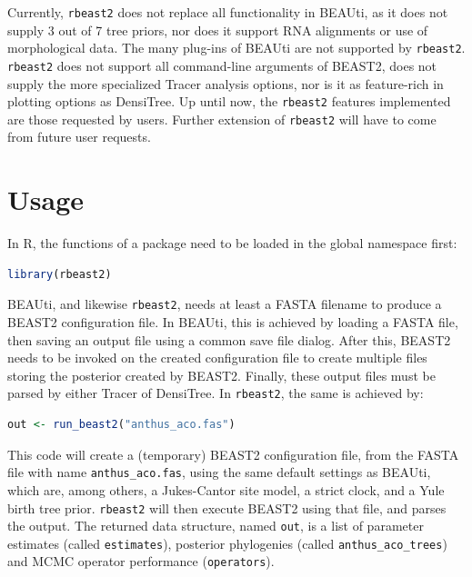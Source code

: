 \documentclass{article}
\begin{document}
Currently, \verb;rbeast2; does not replace all functionality in BEAUti,
as it does not supply 3 out of 7 tree priors, nor does it support RNA
alignments or use of morphological data. The many plug-ins of BEAUti
are not supported by \verb;rbeast2;. \verb;rbeast2; does not support
all command-line arguments of BEAST2, does not supply
the more specialized Tracer analysis options, nor is it as feature-rich
in plotting options as DensiTree. Up until now, the \verb;rbeast2; features 
implemented are those requested by users. Further extension of \verb;rbeast2; 
will have to come from future user requests.

\section{Usage}

In R, the functions of a package need to be loaded in the global namespace first:

\begin{lstlisting}[language=R, floatplacement=H]
library(rbeast2)
\end{lstlisting}

BEAUti, and likewise \verb;rbeast2;, needs at least a FASTA filename
to produce a BEAST2 configuration file. 
In BEAUti, this is achieved by loading a FASTA file, 
then saving an output file using a common
save file dialog. After this, BEAST2 needs to be invoked
on the created configuration file to create multiple files
storing the posterior created by BEAST2. Finally, these output
files must be parsed by either Tracer of DensiTree.
In \verb;rbeast2;, the same is achieved by:

\begin{lstlisting}[language=R, floatplacement=H]
out <- run_beast2("anthus_aco.fas")
\end{lstlisting}

This code will create a (temporary) BEAST2 configuration file,
from the FASTA file with name \verb;anthus_aco.fas;, 
using the same default settings as BEAUti, which are, 
among others, a Jukes-Cantor site model, a strict clock, and a Yule birth tree prior.
\verb;rbeast2; will then execute BEAST2 using that file, and
parses the output. The returned data structure, named \verb;out;, 
is a list of parameter estimates (called \verb;estimates;), posterior 
phylogenies (called \verb;anthus_aco_trees;)
and MCMC operator performance (\verb;operators;).
\end{document}
